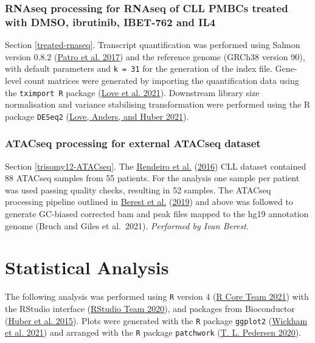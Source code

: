 \documentclass[11pt, a4paper, twosided]{book}
\begin{document}
\hypertarget{rnaseq-processing-for-rnaseq-of-cll-pmbcs-treated-with-dmso-ibrutinib-ibet-762-and-il4}{%
\subsubsection{RNAseq processing for RNAseq of CLL PMBCs treated with DMSO, ibrutinib, IBET-762 and IL4}\label{rnaseq-processing-for-rnaseq-of-cll-pmbcs-treated-with-dmso-ibrutinib-ibet-762-and-il4}}

Section \ref{treated-rnaseq}. Transcript quantification was performed using Salmon version 0.8.2 (\protect\hyperlink{ref-Salmon}{Patro et al. 2017}) and the reference genome (GRCh38 version 90), with default parameters and \texttt{k\ =\ 31} for the generation of the index file. Gene-level count matrices were generated by importing the quantification data using the \texttt{tximport\ R} package (\protect\hyperlink{ref-R-tximport}{Love et al. 2021}). Downstream library size normalisation and variance stabilising transformation were performed using the R package \texttt{DESeq2} (\protect\hyperlink{ref-R-DESeq2}{Love, Anders, and Huber 2021}).

\hypertarget{atacseq-processing-for-external-atacseq-dataset}{%
\subsubsection{ATACseq processing for external ATACseq dataset}\label{atacseq-processing-for-external-atacseq-dataset}}

Section \ref{trisomy12-ATACseq}. The \protect\hyperlink{ref-Rendeiro2016}{Rendeiro et al.} (\protect\hyperlink{ref-Rendeiro2016}{2016}) CLL dataset contained 88 ATACseq samples from 55 patients. For the analysis one sample per patient was used passing quality checks, resulting in 52 samples. The ATACseq processing pipeline outlined in \protect\hyperlink{ref-Berest2019}{Berest et al.} (\protect\hyperlink{ref-Berest2019}{2019}) and above was followed to generate GC-biased corrected bam and peak files mapped to the hg19 annotation genome (Bruch and Giles et al.~2021). \emph{Performed by Ivan Berest.}

\hypertarget{statistical-analysis}{%
\section{Statistical Analysis}\label{statistical-analysis}}

The following analysis was performed using \texttt{R} version 4 (\protect\hyperlink{ref-R-base}{R Core Team 2021}) with the RStudio interface (\protect\hyperlink{ref-RStudio}{RStudio Team 2020}), and packages from Bioconductor (\protect\hyperlink{ref-Bioconductor}{Huber et al. 2015}). Plots were generated with the \texttt{R} package \texttt{ggplot2} (\protect\hyperlink{ref-R-ggplot2}{Wickham et al. 2021}) and arranged with the \texttt{R} package \texttt{patchwork} (\protect\hyperlink{ref-R-patchwork}{T. L. Pedersen 2020}).
\end{document}
